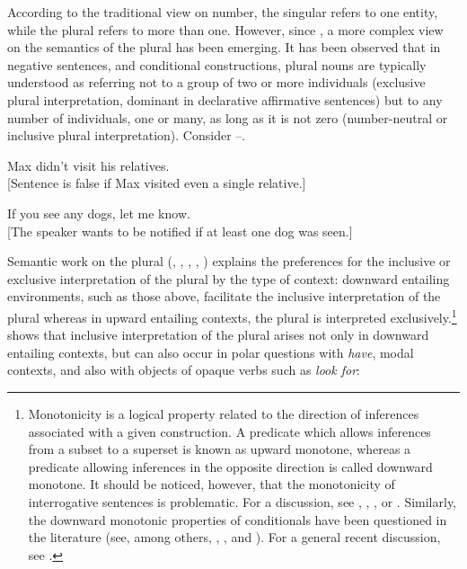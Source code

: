 \documentclass[output=paper,colorlinks,citecolor=brown,
]{langscibook}
\begin{document}
According to the traditional view on number, the singular refers to one entity, while the plural refers to more than one. However, since \citet{Krifka1989}, a more complex view on the semantics of the plural has been emerging. It has been observed that in negative sentences, and conditional constructions, plural nouns are typically understood as referring not to a group of two or more individuals (exclusive plural interpretation, dominant in declarative affirmative sentences) but to any number of individuals, one or many, as long as it is not zero (number-neutral or inclusive plural interpretation). Consider --.

\ea\label{ex:6}
Max didn't visit his relatives.\\
{[}Sentence is false if Max visited even a single relative.{]}
\z

\ea\label{ex:7}  
If you see any dogs, let me know.\\
{[}The speaker wants to be notified if at least one dog was seen.{]}
\z

\noindent Semantic work on the plural (\citealt{Sauerland2003}, \citealt{SauerlandYatsushiro2005}, \citealt{Spector2007}, \citealt{Zweig2009}, \citealt{BaleKhanjian2011}) explains the preferences for the inclusive or exclusive interpretation of the plural by the type of context: downward entailing environments, such as those above, facilitate the inclusive interpretation of the plural whereas in upward entailing contexts, the plural is interpreted exclusively.\footnote{Monotonicity is a logical property related to the direction of inferences associated with a given construction. A predicate which allows inferences from a subset to a superset is known as upward monotone, whereas a predicate allowing inferences in the opposite direction is called downward monotone. It should be noticed, however, that the monotonicity of interrogative sentences is problematic. For a discussion, see \citet{Giannakidou1998}, \citet{Gutierrez-Rexach1997}, \citet{Progovac1993}, or \citet{vanderWouden1997}. Similarly, the downward monotonic properties of conditionals have been questioned in the literature (see, among others, \citealt{Gajewski2011}, \citealt{Heim1984}, and \citealt{vonFintel1999}). For a general recent discussion, see \citet{GulgowskiBlaszczak2020}.} \citet{Grimm2013} shows that inclusive interpretation of the plural arises not only in downward entailing contexts, but can also occur in polar questions with \textit{have}, modal contexts, and also with objects of opaque verbs such as \textit{look for}:
\end{document}
